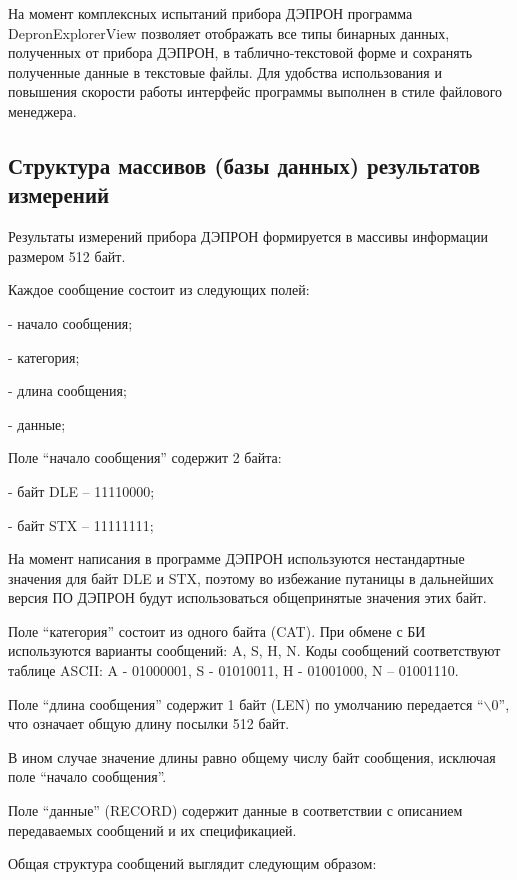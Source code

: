 \documentclass[a4paper,portrait,12pt]{article}
\begin{document}
{{{{На момент комплексных испытаний прибора ДЭПРОН программа DepronExplorerView позволяет отображать все типы бинарных данных, полученных от прибора ДЭПРОН, в таблично-текстовой форме и сохранять полученные данные в текстовые файлы. Для удобства использования и повышения скорости работы интерфейс программы выполнен в стиле файлового менеджера.





\newpage



\subsection*{	\textbf{Структура массивов (базы данных) результатов измерений}}

Результаты измерений прибора ДЭПРОН формируется в массивы информации размером 512 байт.


Каждое сообщение состоит из следующих полей:


-  начало сообщения;


-  категория;


-  длина сообщения;


-  данные;


Поле {``}начало сообщения'' содержит 2 байта:


-  байт DLE -- 11110000;


-  байт STX -- 11111111;


На момент написания в программе ДЭПРОН используются нестандартные значения для байт DLE и STX, поэтому во избежание путаницы в дальнейших версия ПО ДЭПРОН будут использоваться общепринятые значения этих байт.


Поле {``}категория'' состоит из одного байта (CAT). При обмене с БИ используются варианты сообщений: A, S, H, N. Коды сообщений соответствуют таблице ASCII: A - 01000001, S - 01010011, H - 01001000, N -- 01001110.


Поле {``}длина сообщения'' содержит 1 байт (LEN) по умолчанию передается {``}\ensuremath{\backslash}0'', что означает общую длину посылки 512 байт.


В ином случае значение длины равно общему числу байт сообщения, исключая поле {``}начало сообщения''.


Поле {``}данные'' (RECORD) содержит данные в соответствии с описанием передаваемых сообщений и их спецификацией.





Общая структура сообщений выглядит следующим образом:


}}}}
\end{document}
